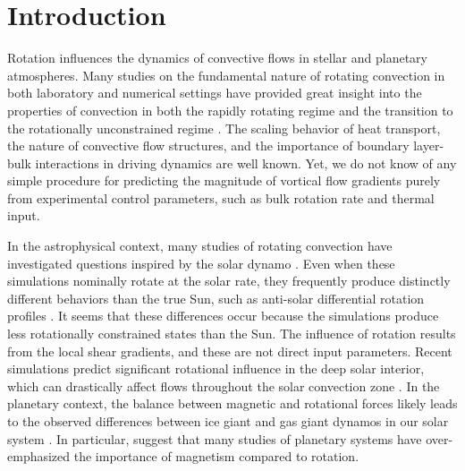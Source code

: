 \documentclass[twocolumn, amsmath, amsfonts, amssymb, trackchanges]{aastex62}
\begin{document}
\section{Introduction}
\label{sec:intro}
Rotation influences the dynamics of convective flows in
stellar and planetary atmospheres.
Many studies on the fundamental nature of
rotating convection in both laboratory and numerical settings
have provided great insight into the properties of convection 
in both the rapidly rotating regime 
\citep{julien&all2012, stellmach&all2014, gastine&all2016}
and the transition to the rotationally unconstrained regime \citep{king&all2009, zhong&all2009, 
cheng&all2015}. 
The scaling behavior of heat transport, the nature of convective flow
structures, and the importance of boundary layer-bulk interactions in driving dynamics are well known.
Yet, we do not know of any simple procedure for predicting the magnitude of vortical flow gradients 
purely from experimental control parameters, such as bulk rotation rate and thermal input.

In the astrophysical context,
many studies of rotating convection have investigated questions inspired by the solar dynamo
\citep{glatzmaier&gilman1982, busse2002, brown&all2008,
brown&all2010, brown&all2011, augustson&all2012, guerrero&all2013, kapyla&all2014}.
Even when these simulations nominally rotate at the solar rate,
they frequently produce distinctly different behaviors than the true Sun,
such as anti-solar differential rotation profiles  \citep{gastine&all2014}.
It seems that these differences occur because the simulations produce less rotationally 
constrained states than the Sun. 
The influence of rotation results from the local 
shear gradients, and these are not direct input parameters.
Recent simulations predict significant rotational influence in the deep solar interior, 
which can drastically affect flows throughout the solar convection zone 
\citep{featherstone&hindman2016, greer&all2016}. 
In the planetary context, the balance between magnetic
and rotational forces likely leads to the observed differences between ice
giant and gas giant dynamos in our solar system \citep{soderlund&all2015}.
In particular, \cite{aurnou&king2017} suggest that many studies of planetary systems
have over-emphasized the importance of magnetism compared to rotation.
\end{document}
